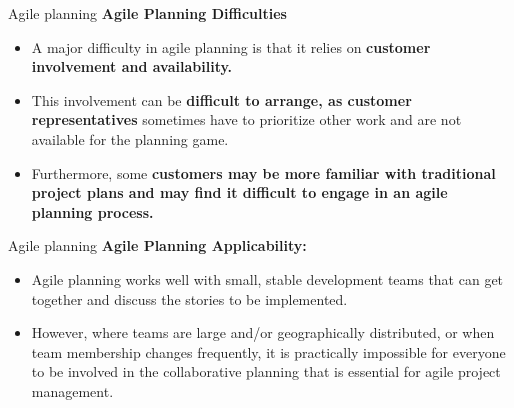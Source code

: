 \documentclass{beamer}
\begin{document}
\begin{frame}{Agile planning}
\textbf{Agile Planning Difficulties}
\begin{itemize}
	\item A major difficulty in agile planning is that it relies on\textbf{ customer involvement and availability. }
	\item This involvement can be \textbf{difficult to arrange, as customer representatives} sometimes have to prioritize 
	other work and are not available for the planning game.
	\item Furthermore, some \textbf{customers may be more familiar with traditional project plans and may find it 
		difficult to engage in an agile planning process.}
\end{itemize}
\end{frame}
\begin{frame}{Agile planning}
	\textbf{Agile Planning Applicability:}
	\begin{itemize}
		\item Agile planning works well with small, stable development teams that can get 
		together and discuss the stories to be implemented.
		\item However, where teams are large and/or geographically distributed, or when team membership 
		changes frequently, it is practically impossible for everyone to be involved in the collaborative planning 
		that is essential for agile project management.
		
	\end{itemize}
\end{frame}
\end{document}
